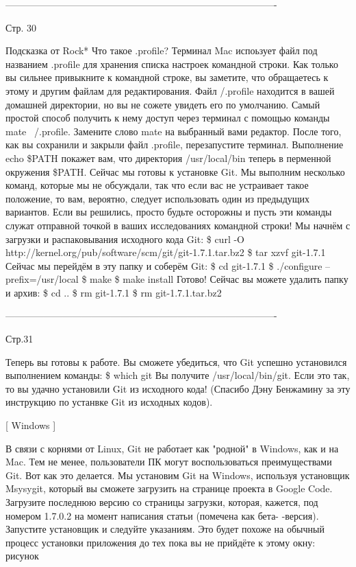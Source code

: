 -------------------------------------------------------------------------------------

Стр. 30

        Подсказка от Rock*
        Что такое .profile? Терминал Mac испоьзует файл под названием .profile для 
        хранения списка настроек командной строки. Как только вы сильнее привыкните
        к командной строке, вы заметите, что обращаетесь к этому и другим файлам для
        редактирования. Файл /.profile находится в вашей домашней директории, но вы 
        не сожете увидеть его по умолчанию. Самый простой способ получить к нему 
        доступ через терминал с помощью команды mate ~/.profile. Замените слово mate 
        на выбранный вами редактор.
После того, как вы сохранили и закрыли файл .profile, перезапустите терминал.
Выполнение echo \$PATH покажет вам, что директория /usr/local/bin теперь в перменной
окружения \$PATH.
Сейчас мы готовы к установке Git. Мы выполним несколько команд, которые мы не обсуждали, 
так что если вас не устраивает такое положение, то вам, вероятно, следует использовать
один из предыдущих вариантов. Если вы решились, просто будьте осторожны и пусть эти 
команды служат отправной точкой в ваших исследованиях командной строки!
Мы начнём  с загрузки и распаковывания исходного кода Git:
\$ curl -O http://kernel.org/pub/software/scm/git/git-1.7.1.tar.bz2
\$ tar xzvf git-1.7.1
Сейчас мы перейдём в эту папку и соберём Git:
\$ cd git-1.7.1
\$ ./configure --prefix=/usr/local
\$ make
\$ make install
Готово! Сейчас вы можете удалить папку и архив:
\$ cd ..
\$ rm git-1.7.1
\$ rm git-1.7.1.tar.bz2

-------------------------------------------------------------------------------------

Стр.31

Теперь вы готовы к работе. Вы сможете убедиться, что Git успешно установился 
выполнением команды:
\$ which git
Вы получите /usr/local/bin/git. Если это так, то вы удачно установили Git из исходного 
кода! (Спасибо Дэну Бенжамину за эту инструкцию по устанвке Git из исходных кодов).

[ Windows ]

В связи с корнями от Linux, Git не работает как "родной" в Windows, как и на Mac. Тем 
не менее, пользователи ПК могут воспользоваться преимуществами Git. Вот как это 
делается.
Мы установим Git на Windows, используя установщик Msysygit, который вы сможете загрузить
на странице проекта в Google Code. Загрузите последнюю версию со страницы загрузки, 
которая, кажется, под номером 1.7.0.2 на момент написания статьи (помечена как бета-
-версия). Запустите установщик и следуйте указаниям. Это будет похоже на обычный процесс
установки приложения до тех пока вы не прийдёте к этому окну:
{рисунок}

